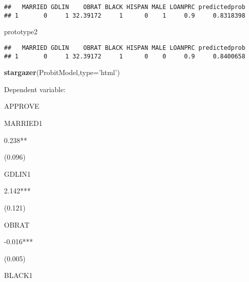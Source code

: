 \documentclass[]{article}
\newenvironment{Shaded}{\begin{snugshade}}{\end{snugshade}}
\newcommand{\DataTypeTok}[1]{\textcolor[rgb]{0.13,0.29,0.53}{#1}}
\newcommand{\KeywordTok}[1]{\textcolor[rgb]{0.13,0.29,0.53}{\textbf{#1}}}
\newcommand{\NormalTok}[1]{#1}
\newcommand{\OperatorTok}[1]{\textcolor[rgb]{0.81,0.36,0.00}{\textbf{#1}}}
\newcommand{\StringTok}[1]{\textcolor[rgb]{0.31,0.60,0.02}{#1}}
\begin{document}
\begin{Shaded}
\end{Shaded}

\begin{verbatim}
##   MARRIED GDLIN    OBRAT BLACK HISPAN MALE LOANPRC predictedprob
## 1       0     1 32.39172     1      0    1     0.9     0.8318398
\end{verbatim}

\begin{Shaded}
\begin{Highlighting}[]
\NormalTok{prototype2}
\end{Highlighting}
\end{Shaded}

\begin{verbatim}
##   MARRIED GDLIN    OBRAT BLACK HISPAN MALE LOANPRC predictedprob
## 1       0     1 32.39172     1      0    0     0.9     0.8400658
\end{verbatim}

\begin{Shaded}
\begin{Highlighting}[]
\KeywordTok{stargazer}\NormalTok{(ProbitModel,}\DataTypeTok{type=}\StringTok{'html'}\NormalTok{) }
\end{Highlighting}
\end{Shaded}

Dependent variable:

APPROVE

MARRIED1

0.238**

(0.096)

GDLIN1

2.142***

(0.121)

OBRAT

-0.016***

(0.005)

BLACK1
\end{document}
